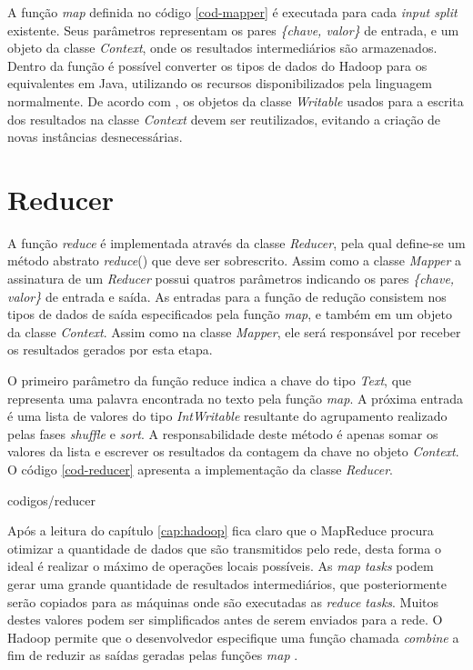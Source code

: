 A função \textit{map} definida no código \ref{cod-mapper} é executada para cada \textit{input split} existente. Seus parâmetros representam os pares \textit{\{chave, valor\}} de entrada, e um objeto da classe \textit{Context}, onde os resultados intermediários são armazenados. Dentro da função é possível converter os tipos de dados do Hadoop para os equivalentes em Java, utilizando os recursos disponibilizados pela linguagem normalmente. De acordo com , os objetos da classe \textit{Writable} usados para a escrita dos resultados na classe \textit{Context} devem ser reutilizados, evitando a criação de novas instâncias desnecessárias.

\section{Reducer}

A função \textit{reduce} é implementada através da classe \textit{Reducer}, pela qual define-se um método abstrato \textit{reduce}() que deve ser sobrescrito. Assim como a classe \textit{Mapper} a assinatura de um \textit{Reducer} possui quatros parâmetros indicando os pares \textit{\{chave, valor\}} de entrada e saída. As entradas para a função de redução consistem nos tipos de dados de saída especificados pela função \textit{map}, e também em um objeto da classe \textit{Context}. Assim como na classe \textit{Mapper}, ele será responsável por receber os resultados gerados por esta etapa. 

O primeiro parâmetro da função reduce indica a chave do tipo \textit{Text}, que representa uma palavra encontrada no texto pela função \textit{map}. A próxima entrada é uma lista de valores do tipo \textit{IntWritable} resultante do agrupamento realizado pelas fases \textit{shuffle} e \textit{sort}. A responsabilidade deste método é apenas somar os valores da lista e escrever os resultados da contagem da chave no objeto \textit{Context}. O código \ref{cod-reducer} apresenta a implementação da classe \textit{Reducer}.


		{codigos/reducer}

Após a leitura do capítulo \ref{cap:hadoop} fica claro que o MapReduce procura otimizar a quantidade de dados que são transmitidos pelo rede, desta forma o ideal é realizar o máximo de operações locais possíveis. As \textit{map tasks} podem gerar uma grande quantidade de resultados intermediários, que posteriormente serão copiados para as máquinas onde são executadas as \textit{reduce tasks}. Muitos destes valores podem ser simplificados antes de serem enviados para a rede. O Hadoop permite que o desenvolvedor especifique uma função chamada \textit{combine} a fim de reduzir as saídas geradas pelas funções \textit{map} \cite{white2012}.

